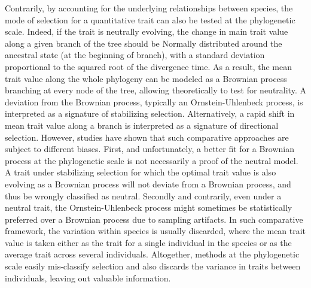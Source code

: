 \documentclass{article}
\begin{document}
Contrarily, by accounting for the underlying relationships between species, the mode of selection for a quantitative trait can also be tested at the phylogenetic scale\cite{felsenstein_phylogenies_1985}.
Indeed, if the trait is neutrally evolving, the change in main trait value along a given branch of the tree should be Normally distributed around the ancestral state (at the beginning of branch), with a standard deviation proportional to the squared root of the divergence time\cite{hansen_translating_1996}.
As a result, the mean trait value along the whole phylogeny can be modeled as a Brownian process branching at every node of the tree, allowing theoretically to test for neutrality\cite{hansen_translating_1996, harmon_phylogenetic_2018}.
A deviation from the Brownian process, typically an Ornstein-Uhlenbeck process, is interpreted as a signature of stabilizing selection\cite{catalan_drift_2019}.
Alternatively, a rapid shift in mean trait value along a branch is interpreted as a signature of directional selection.
However, studies have shown that such comparative approaches are subject to different biases\cite{harmon_phylogenetic_2018}.
First, and unfortunately, a better fit for a Brownian process at the phylogenetic scale is not necessarily a proof of the neutral model.
A trait under stabilizing selection for which the optimal trait value is also evolving as a Brownian process will not deviate from a Brownian process, and thus be wrongly classified as neutral\cite{hansen_translating_1996}.
Secondly and contrarily, even under a neutral trait, the Ornstein-Uhlenbeck process might sometimes be statistically preferred over a Brownian process due to sampling artifacts\cite{silvestro_measurement_2015, cooper_cautionary_2016, price_detecting_2022}.
In such comparative framework, the variation within species is usually discarded, where the mean trait value is taken either as the trait for a single individual in the species or as the average trait across several individuals.
Altogether, methods at the phylogenetic scale easily mis-classify selection and also discards the variance in traits between individuals, leaving out valuable information.
\end{document}
